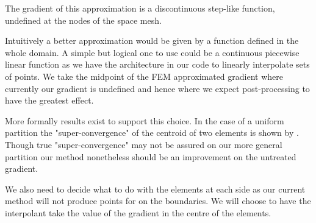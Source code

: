 \documentclass{uonmathreport}
\theoremstyle{definition}
\theoremstyle{problem}
\theoremstyle{theorem}
\begin{document}
The gradient of this approximation is a discontinuous step-like function, undefined at the nodes of the space mesh.

\begin{center}
\end{center}

Intuitively a better approximation would be given by a function defined in the whole domain. A simple but logical one to use could be a continuous piecewise linear function as we have the architecture in our code to linearly interpolate sets of points. We take the midpoint of the FEM approximated gradient where currently our gradient is undefined and hence where we expect post-processing to have the greatest effect. 

More formally results exist to support this choice. In the case of a uniform partition the "super-convergence" of the centroid of two elements is shown by \cite{zlamal1978superconvergence}. Though true "super-convergence" may not be assured on our more general partition our method nonetheless should be an improvement on the untreated gradient. 

We also need to decide what to do with the elements at each side as our current method will not produce points for on the boundaries. We will choose to have the interpolant take the value of the gradient in the centre of the elements.



\begin{center}
\end{center}
\end{document}
